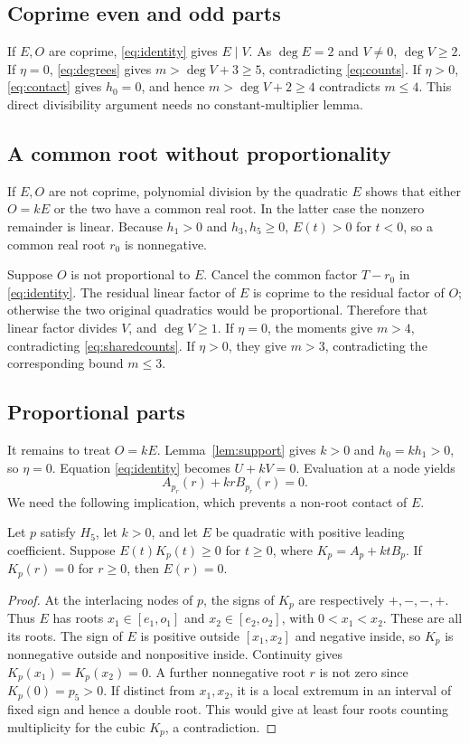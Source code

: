 \documentclass[11pt]{article}
\begin{document}
\subsection{Coprime even and odd parts}
If $E,O$ are coprime, \eqref{eq:identity} gives $E\mid V$. As $\deg E=2$ and $V\ne0$, $\deg V\ge2$. If $\eta=0$, \eqref{eq:degrees} gives $m>\deg V+3\ge5$, contradicting \eqref{eq:counts}. If $\eta>0$, \eqref{eq:contact} gives $h_0=0$, and hence $m>\deg V+2\ge4$ contradicts $m\le4$. This direct divisibility argument needs no constant-multiplier lemma.

\subsection{A common root without proportionality}
If $E,O$ are not coprime, polynomial division by the quadratic $E$ shows that either $O=kE$ or the two have a common real root. In the latter case the nonzero remainder is linear. Because $h_1>0$ and $h_3,h_5\ge0$, $E(t)>0$ for $t<0$, so a common real root $r_0$ is nonnegative.

Suppose $O$ is not proportional to $E$. Cancel the common factor $T-r_0$ in \eqref{eq:identity}. The residual linear factor of $E$ is coprime to the residual factor of $O$; otherwise the two original quadratics would be proportional. Therefore that linear factor divides $V$, and $\deg V\ge1$. If $\eta=0$, the moments give $m>4$, contradicting \eqref{eq:sharedcounts}. If $\eta>0$, they give $m>3$, contradicting the corresponding bound $m\le3$.

\subsection{Proportional parts}
It remains to treat $O=kE$. Lemma~\ref{lem:support} gives $k>0$ and $h_0=kh_1>0$, so $\eta=0$. Equation \eqref{eq:identity} becomes $U+kV=0$. Evaluation at a node yields
\begin{equation}\label{eq:kernel}
 A_{p_r}(r)+krB_{p_r}(r)=0.
\end{equation}
We need the following implication, which prevents a non-root contact of $E$.

\begin{lemma}\label{lem:kernel}
Let $p$ satisfy $H_5$, let $k>0$, and let $E$ be quadratic with positive leading coefficient. Suppose $E(t)K_p(t)\ge0$ for $t\ge0$, where $K_p=A_p+ktB_p$. If $K_p(r)=0$ for $r\ge0$, then $E(r)=0$.
\end{lemma}
\begin{proof}
At the interlacing nodes of $p$, the signs of $K_p$ are respectively $+,-,-,+$. Thus $E$ has roots $x_1\in[e_1,o_1]$ and $x_2\in[e_2,o_2]$, with $0<x_1<x_2$. These are all its roots. The sign of $E$ is positive outside $[x_1,x_2]$ and negative inside, so $K_p$ is nonnegative outside and nonpositive inside. Continuity gives $K_p(x_1)=K_p(x_2)=0$. A further nonnegative root $r$ is not zero since $K_p(0)=p_5>0$. If distinct from $x_1,x_2$, it is a local extremum in an interval of fixed sign and hence a double root. This would give at least four roots counting multiplicity for the cubic $K_p$, a contradiction.
\end{proof}
\end{document}
